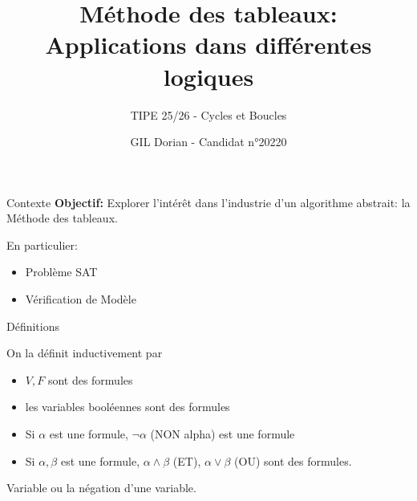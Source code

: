 \documentclass{beamer}
\title{Méthode des tableaux: Applications dans différentes logiques}
\author{GIL Dorian - Candidat n°20220}
\subtitle{TIPE 25/26 - Cycles et Boucles}
\date{}
\begin{document}
\begin{frame}
\titlepage
\end{frame}

\begin{frame}{Contexte}
    \textbf{Objectif:} Explorer l'intérêt dans l'industrie d'un algorithme abstrait: la Méthode des tableaux.
    \pause
    \vspace{10px}
    
    En particulier:
    \begin{itemize}
        \item Problème SAT
        \item Vérification de Modèle
    \end{itemize}
\end{frame}

\begin{frame}{Définitions}
    \begin{definition}
        On la définit inductivement par
        \begin{itemize}
            \item $V, F$ sont des formules
            \item les variables booléennes sont des formules
            \item Si $\alpha$ est une formule, $\lnot\alpha$ (NON alpha) est une formule
            \item Si $\alpha, \beta$ est une formule, $\alpha\land\beta$ (ET), $\alpha\lor\beta$ (OU) sont des formules.
        \end{itemize}
    \end{definition}
    \begin{definition}[Litteraux]
        Variable ou la négation d'une variable.
    \end{definition}

\end{frame}
\end{document}
